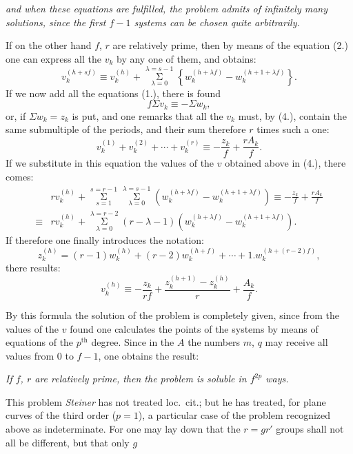 \documentclass{article}
\begin{document}
\emph{and when these equations are fulfilled, the problem admits of infinitely many solutions, since the first $f-1$ systems can be chosen quite arbitrarily.}

If on the other hand $f$, $r$ are relatively prime, then by means of the equation (2.) one can express all the $v_{k}$ by any one of them, and obtains:
\[ v_{k}^{(h+sf)} \equiv v_{k}^{(h)}+\mathop{\Sigma}\limits_{\lambda=0}^{\lambda=s-1}\left\{ w_{k}^{(h+\lambda f)}-w_{k}^{(h+1+\lambda f)} \right\}. \tag{4.} \]
If we now add all the equations (1.), there is found
\[ f\Sigma v_{k} \equiv -\Sigma w_{k}, \]
or, if $\Sigma w_{k}=z_{k}$ is put, and one remarks that all the $v_{k}$ must, by (4.), contain the same submultiple of the periods, and their sum therefore $r$ times such a one:
\[ v_{k}^{(1)}+v_{k}^{(2)}+\cdots+v_{k}^{(r)} \equiv -\frac{z_{k}}{f}+\frac{rA_{k}}{f}. \]
If we substitute in this equation the values of the $v$ obtained above in (4.), there comes:
\[ \begin{aligned}
& r v_{k}^{(h)}+\mathop{\Sigma}\limits_{s=1}^{s=r-1}\mathop{\Sigma}\limits_{\lambda=0}^{\lambda=s-1}\left( w_{k}^{(h+\lambda f)}-w_{k}^{(h+1+\lambda f)} \right) \equiv -\frac{z_{k}}{f}+\frac{rA_{k}}{f} \\
\equiv{} & r v_{k}^{(h)}+\mathop{\Sigma}\limits_{\lambda=0}^{\lambda=r-2}(r-\lambda-1)\left( w_{k}^{(h+\lambda f)}-w_{k}^{(h+1+\lambda f)} \right).
\end{aligned} \]
If therefore one finally introduces the notation:
\[ z_{k}^{(h)} = (r-1)w_{k}^{(h)}+(r-2)w_{k}^{(h+f)}+\cdots+1.w_{k}^{(h+(r-2)f)}, \tag{5.} \]
there results:
\[ v_{k}^{(h)} \equiv -\frac{z_{k}}{rf}+\frac{z_{k}^{(h+1)}-z_{k}^{(h)}}{r}+\frac{A_{k}}{f}. \tag{6.} \]

By this formula the solution of the problem is completely given, since from the values of the $v$ found one calculates the points of the systems by means of equations of the $p^{\text{th}}$ degree. Since in the $A$ the numbers $m$, $q$ may receive all values from 0 to $f-1$, one obtains the result:

\emph{If $f$, $r$ are relatively prime, then the problem is soluble in $f^{2p}$ ways.}

This problem \emph{Steiner} has not treated loc.\ cit.; but he has treated, for plane curves of the third order ($p=1$), a particular case of the problem recognized above as indeterminate. For one may lay down that the $r=gr'$ groups shall not all be different, but that only $g$
\end{document}
